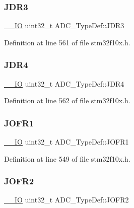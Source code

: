 \subsubsection{\texorpdfstring{J\+D\+R3}{JDR3}}
{\footnotesize\ttfamily \hyperlink{core__sc300_8h_aec43007d9998a0a0e01faede4133d6be}{\+\_\+\+\_\+\+IO} uint32\+\_\+t A\+D\+C\+\_\+\+Type\+Def\+::\+J\+D\+R3}



Definition at line 561 of file stm32f10x.\+h.

\mbox{\label{struct_a_d_c___type_def_abae6e9d688b16ef350878998f5e21c0b}} 
\subsubsection{\texorpdfstring{J\+D\+R4}{JDR4}}
{\footnotesize\ttfamily \hyperlink{core__sc300_8h_aec43007d9998a0a0e01faede4133d6be}{\+\_\+\+\_\+\+IO} uint32\+\_\+t A\+D\+C\+\_\+\+Type\+Def\+::\+J\+D\+R4}



Definition at line 562 of file stm32f10x.\+h.

\mbox{\label{struct_a_d_c___type_def_aa005e656f528aaad28d70d61c9db9b81}} 
\subsubsection{\texorpdfstring{J\+O\+F\+R1}{JOFR1}}
{\footnotesize\ttfamily \hyperlink{core__sc300_8h_aec43007d9998a0a0e01faede4133d6be}{\+\_\+\+\_\+\+IO} uint32\+\_\+t A\+D\+C\+\_\+\+Type\+Def\+::\+J\+O\+F\+R1}



Definition at line 549 of file stm32f10x.\+h.

\mbox{\label{struct_a_d_c___type_def_aa20f76044c11042dde41c1060853fb82}} 
\subsubsection{\texorpdfstring{J\+O\+F\+R2}{JOFR2}}
{\footnotesize\ttfamily \hyperlink{core__sc300_8h_aec43007d9998a0a0e01faede4133d6be}{\+\_\+\+\_\+\+IO} uint32\+\_\+t A\+D\+C\+\_\+\+Type\+Def\+::\+J\+O\+F\+R2}



